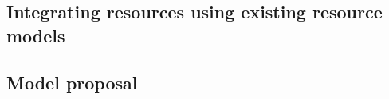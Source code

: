 

\subsection{Integrating \texorpdfstring{}{INP} resources using existing resource models}


\subsection{Model proposal} \label{model_proposal}
